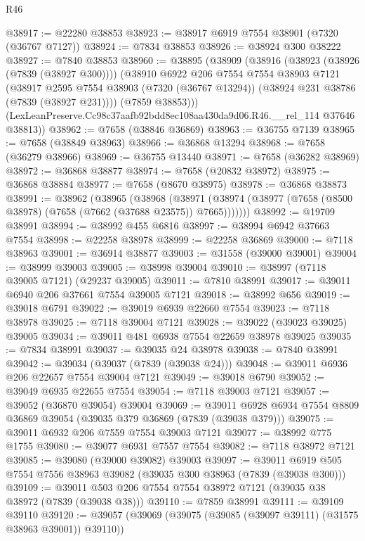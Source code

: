 \begin{lexlean}{R46}
\begin{coremodule}
@38917 := @22280 @38853
@38923 := @38917 @6919 @7554 @38901 (@7320 (@36767 @7127))
@38924 := @7834 @38853
@38926 := @38924 @300 @38222
@38927 := @7840 @38853
@38960 := @38895
    (@38909
      (@38916
        (@38923 (@38926 (@7839 (@38927 @300))))
        (@38910
          @6922
          @206
          @7554
          @7554
          @38903
          @7121
          (@38917
            @2595
            @7554
            @38903
            (@7320 (@36767 @13294))
            (@38924 @231 @38786 (@7839 (@38927 @231))))
          (@7859 @38853)))
      (LexLeanPreserve.Cc98c37aafb92bdd8ec108aa430da9d06.R46.__rel_114 @37646 @38813))
@38962 := @7658 (@38846 @36869)
@38963 := @36755 @7139
@38965 := @7658 (@38849 @38963)
@38966 := @36868 @13294
@38968 := @7658 (@36279 @38966)
@38969 := @36755 @13440
@38971 := @7658 (@36282 @38969)
@38972 := @36868 @38877
@38974 := @7658 (@20832 @38972)
@38975 := @36868 @38884
@38977 := @7658 (@8670 @38975)
@38978 := @36868 @38873
@38991 := @38962
    (@38965
      (@38968
        (@38971 (@38974 (@38977 (@7658 (@8500 @38978) (@7658 (@7662 (@37688 @23575)) @7665)))))))
@38992 := @19709 @38991
@38994 := @38992 @455 @6816
@38997 := @38994 @6942 @37663 @7554
@38998 := @22258 @38978
@38999 := @22258 @36869
@39000 := @7118 @38963
@39001 := @36914 @38877
@39003 := @31558 (@39000 @39001)
@39004 := @38999 @39003
@39005 := @38998 @39004
@39010 := @38997 (@7118 @39005 @7121) (@29237 @39005)
@39011 := @7810 @38991
@39017 := @39011 @6940 @206 @37661 @7554 @39005 @7121
@39018 := @38992 @656
@39019 := @39018 @6791
@39022 := @39019 @6939 @22660 @7554
@39023 := @7118 @38978
@39025 := @7118 @39004 @7121
@39028 := @39022 (@39023 @39025) @39005
@39034 := @39011 @481 @6938 @7554 @22659 @38978 @39025
@39035 := @7834 @38991
@39037 := @39035 @24 @38978
@39038 := @7840 @38991
@39042 := @39034 (@39037 (@7839 (@39038 @24)))
@39048 := @39011 @6936 @206 @22657 @7554 @39004 @7121
@39049 := @39018 @6790
@39052 := @39049 @6935 @22655 @7554
@39054 := @7118 @39003 @7121
@39057 := @39052 (@36870 @39054) @39004
@39069 := @39011 @6928 @6934 @7554 @8809 @36869 @39054 (@39035 @379 @36869 (@7839 (@39038 @379)))
@39075 := @39011 @6932 @206 @7559 @7554 @39003 @7121
@39077 := @38992 @775 @1755
@39080 := @39077 @6931 @7557 @7554
@39082 := @7118 @38972 @7121
@39085 := @39080 (@39000 @39082) @39003
@39097 := @39011 @6919 @505 @7554 @7556 @38963 @39082 (@39035 @300 @38963 (@7839 (@39038 @300)))
@39109 := @39011 @503 @206 @7554 @7554 @38972 @7121 (@39035 @38 @38972 (@7839 (@39038 @38)))
@39110 := @7859 @38991
@39111 := @39109 @39110
@39120 := @39057 (@39069 (@39075 (@39085 (@39097 @39111) (@31575 @38963 @39001)) @39110))

\end{coremodule}
\end{lexlean}
